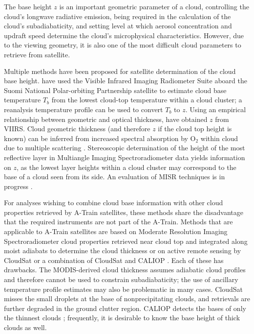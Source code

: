 \documentclass[essd,manuscript]{copernicus}\usepackage[]{graphicx}\usepackage[]{color}
\newcommand\CBH{\ensuremath{z}}
\begin{document}
\introduction  %
\label{sec:intro}
The base height \CBH{} is an important geometric parameter of a cloud,
controlling the cloud's longwave radiative emission, being required in the
calculation of the cloud's subadiabaticity, and setting level at which aerosol
concentration and updraft speed determine the cloud's microphysical
characteristics.  However, due to the viewing geometry, it is also one of the
most difficult cloud parameters to retrieve from satellite.

Multiple methods have been proposed for satellite determination of the cloud
base height.  \cite{Zhu2014} have used the Visible Infrared Imaging Radiometer Suite
aboard the Suomi National Polar-orbiting Partnership satellite
\citep[VIIRS,][]{Cao2014} to estimate cloud base temperature $T_b$ from the
lowest cloud-top temperature within a cloud cluster; a reanalysis temperature
profile can be used to convert $T_b$ to \CBH{}.  Using an empirical relationship
between geometric and optical thickness, \cite{Fitch2016} have obtained \CBH{} from
VIIRS.  Cloud geometric thickness (and therefore \CBH{} if the cloud top height is
known) can be inferred from increased spectral absorption by O$_2$ within cloud
due to multiple scattering \citep{Kokhanovsky2005}.  Stereoscopic determination of
the height of the most reflective layer \citep{Naud2005,Naud2007} in Multiangle
Imaging Spectroradiometer data \citep[MISR,][]{Diner1998} yields information on
\CBH{}, as the lowest layer heights within a cloud cluster may correspond to the
base of a cloud seen from its side.  An evaluation of MISR
  techniques is in progress \citep{Boehm2017}.

For analyses wishing to combine cloud base information with other cloud
properties retrieved by A-Train satellites, these methods share the disadvantage
that the required instruments are not part of the A-Train.  Methods that are
applicable to A-Train satellites are based on Moderate Resolution Imaging
Spectroradiometer \citep[MODIS,][]{Platnick2017} cloud properties retrieved near
cloud top and integrated along moist adiabats to determine the cloud thickness
\citep{Meerkoetter2007} or on active remote sensing by CloudSat
\citep[2B-GEOPROF,][]{Marchand2008} or a combination of CloudSat and CALIOP
\citep[2B-GEOPROF-LIDAR,][]{Mace2014}.  Each of these has drawbacks.  The
MODIS-derived cloud thickness assumes adiabatic cloud profiles and therefore
cannot be used to constrain subadiabaticity; the use of ancillary temperature
profile estimates may also be problematic in many cases.  CloudSat misses the
small droplets at the base of nonprecipitating clouds, and retrievals are
further degraded in the ground clutter region.  CALIOP detects the bases of only
the thinnest clouds \citep[$\tau < 5$,][]{Mace2014}; frequently, it is desirable
to know the base height of thick clouds as well.
\end{document}
